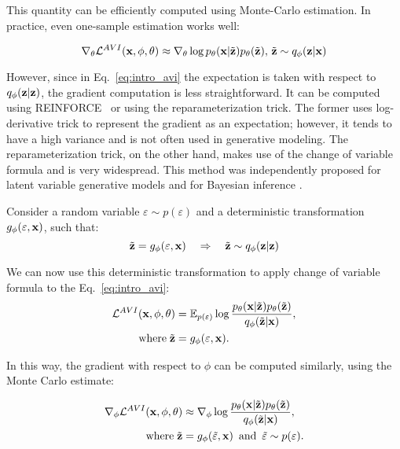 This quantity can be efficiently computed using Monte-Carlo estimation. In practice, even one-sample estimation works well:

\begin{equation}
    \nabla_{\theta}\mathcal{L}^{AVI}({\mathbf{x}}, \phi, \theta) \approx \nabla_{\theta} \log p_{\theta}({\mathbf{x}}|\tilde{{\mathbf{z}}})p_{\theta}(\tilde{{\mathbf{z}}}),\, \tilde{{\mathbf{z}}} \sim q_{\phi}({\mathbf{z}}|{\mathbf{x}})
\end{equation}

However, since in Eq.~\ref{eq:intro_avi} the expectation is taken with respect to $q_{\phi}({\mathbf{z}}|{\mathbf{z}})$, the gradient computation is less straightforward. It can be computed using REINFORCE~\citep{williams1992simple} or using the reparameterization trick.  The former uses log-derivative trick to represent the gradient as an expectation; however, it tends to have a high variance and is not often used in generative modeling. The reparameterization trick, on the other hand, makes use of the change of variable formula and is very widespread. This method was independently proposed for latent variable generative models \cite{kingma2014autoencoding, rezende2014stochastic} and for Bayesian inference \citep{titsias2014doubly}. 

Consider a random variable $\varepsilon \sim p(\varepsilon)$ and a deterministic transformation $g_{\phi}(\varepsilon, {\mathbf{x}})$, such that:
\begin{equation}
    \tilde{{\mathbf{z}}} = g_{\phi}(\varepsilon, {\mathbf{x}})\quad \Rightarrow \quad  \tilde{{\mathbf{z}}} \sim q_{\phi}({\mathbf{z}}|{\mathbf{z}})
\end{equation}

We can now use this deterministic transformation to apply change of variable formula to the Eq.~\ref{eq:intro_avi}:
\begin{equation}
\begin{aligned}
     \mathcal{L}^{AVI}({\mathbf{x}}, \phi, \theta) &=  \mathbb{E}_{p(\varepsilon)}\log  \frac{p_{\theta}({\mathbf{x}}|\tilde{{\mathbf{z}}})p_{\theta}(\tilde{{\mathbf{z}}})}{q_{\phi}(\tilde{{\mathbf{z}}}|{\mathbf{x}})},\\
     \text{where}\; \tilde{{\mathbf{z}}} &= g_{\phi}(\varepsilon, {\mathbf{x}}).
\end{aligned}
\end{equation}

In this way, the gradient with respect to $\phi$ can be computed similarly, using the Monte Carlo estimate:

\begin{equation}
\begin{aligned}
    \nabla_{\phi}\mathcal{L}^{AVI}({\mathbf{x}}, \phi, \theta) &\approx  \nabla_{\phi}\log  \frac{p_{\theta}({\mathbf{x}}|\tilde{{\mathbf{z}}})p_{\theta}(\tilde{{\mathbf{z}}})}{q_{\phi}(\tilde{{\mathbf{z}}}|{\mathbf{x}})}, \\
    \text{where}\; \tilde{{\mathbf{z}}} &= g_{\phi}(\tilde{\varepsilon}, {\mathbf{x}})\,\text{ and }\, \tilde{\varepsilon} \sim p(\varepsilon).
\end{aligned}
\end{equation}

